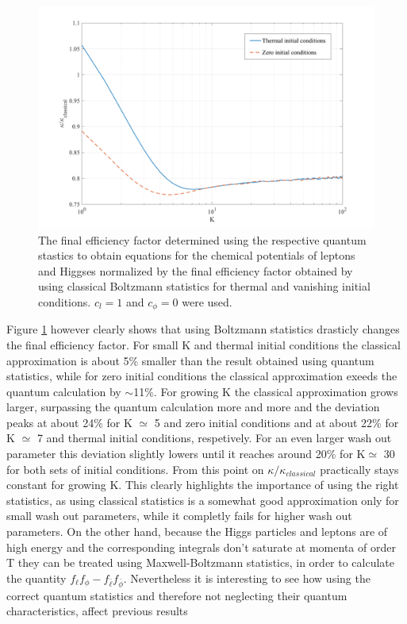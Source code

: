 \begin{figure}[H]
	\centering
	\includegraphics[width=\linewidth]{Images/quantum}
	\caption{The final efficiency factor determined using the respective quantum stastics to obtain equations for the chemical potentials of leptons and Higgses normalized by the final efficiency factor obtained by using classical Boltzmann statistics for thermal and vanishing initial conditions. $c_l=1$ and $c_\phi=0$ were used.}
	\label{fig:quantum}
\end{figure} \noindent
Figure \ref{fig:quantum} however clearly shows that using Boltzmann statistics drasticly changes the final efficiency factor. For small K and thermal initial conditions the classical approximation is about 5\% smaller than the result obtained using quantum statistics, while for zero initial conditions the classical approximation exeeds the quantum calculation by $\sim$11\%. For growing K the classical approximation grows larger, surpassing the quantum calculation more and more and the deviation peaks at about 24\% for K $\simeq$ 5 and zero initial conditions and at about 22\% for K $\simeq$ 7 and thermal initial conditions, respetively. For an even larger wash out parameter this deviation slightly lowers until it reaches around 20\% for K$\simeq$ 30 for both sets of initial conditions. From this point on $\kappa/\kappa_{classical}$ practically stays constant for growing K.
This clearly highlights the importance of using the right statistics, as using classical statistics is a somewhat good approximation only for small wash out parameters, while it completly fails for higher wash out parameters.\newline \indent
On the other hand, because the Higgs particles and leptons are of high energy and the corresponding integrals don't saturate at momenta of order T they can be treated using Maxwell-Boltzmann statistics, in order to calculate the quantity $f_\ell f_\phi-f_{\bar{\ell}}f_{\bar{\phi}}$. Nevertheless it is interesting to see how using the correct quantum statistics and therefore not neglecting their quantum characteristics, affect previous results
